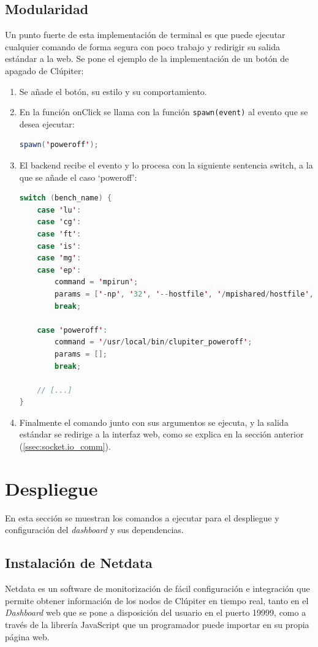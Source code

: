 \subsection{Modularidad}
Un punto fuerte de esta implementación de terminal es que puede ejecutar cualquier comando de forma segura con poco trabajo y redirigir su salida estándar a la web. Se pone el ejemplo de la implementación de un botón de apagado de Clúpiter:

\begin{enumerate}
  \item Se añade el botón, su estilo y su comportamiento.
  \item En la función onClick se llama con la función \texttt{spawn(event)} al evento que se desea ejecutar:
\begin{lstlisting}[language=java]
spawn('poweroff');
\end{lstlisting}
  \item El backend recibe el evento y lo procesa con la siguiente sentencia switch, a la que se añade el caso `poweroff':
\begin{lstlisting}[language=java]
switch (bench_name) {
    case 'lu':
    case 'cg':
    case 'ft':
    case 'is':
    case 'mg':
    case 'ep':
        command = 'mpirun';
        params = ['-np', '32', '--hostfile', '/mpishared/hostfile', '--mca', 'opal_warn_on_missing_libcuda', '0', `/mpishared/NPB3.4.2/NPB3.4-MPI/bin/${bench_name}.*.x`];
        break;

    case 'poweroff':
        command = '/usr/local/bin/clupiter_poweroff';
        params = [];
        break;
    
    // [...]
}
\end{lstlisting}
  \item Finalmente el comando junto con sus argumentos se ejecuta, y la salida estándar se redirige a la interfaz web, como se explica en la sección anterior (\ref{ssec:socket.io_comm}).
\end{enumerate}

\section{Despliegue}
En esta sección se muestran los comandos a ejecutar para el despliegue y configuración del \textit{dashboard} y sus dependencias.

\subsection{Instalación de Netdata}
Netdata es un software de monitorización de fácil configuración e integración que permite obtener información de los nodos de Clúpiter en tiempo real, tanto en el \textit{Dashboard} web que se pone a disposición del usuario en el puerto 19999, como a través de la librería JavaScript que un programador puede importar en su propia página web.

